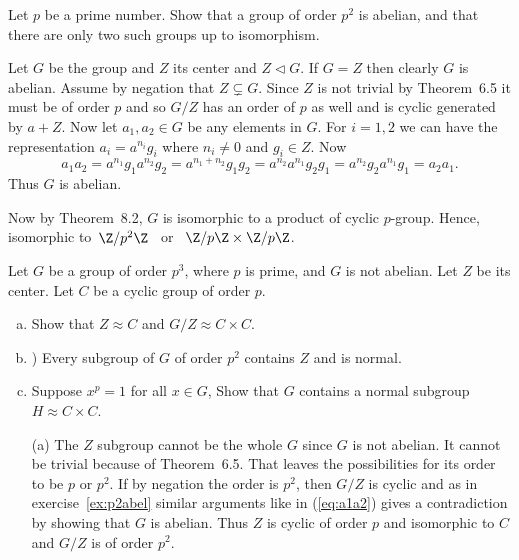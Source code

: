 \documentclass[12pt]{book}
\newcommand{\Zm}[1]{\Z/#1\Z} %
\def\subnormal{\vartriangleleft}
\newcounter{myenumi}
\newenvironment{myenumerate}
{\begin{enumerate}
 \setcounter{enumi}{\themyenumi}
}
{\setcounter{myenumi}{\theenumi}
 \end{enumerate}}
\begin{document}
\begin{myenumerate}

\begin{excopy}
Let $p$ be a prime number. Show that a group of order \(p^2\)
is abelian, and that there are only two such groups up to isomorphism.
\end{excopy}  \label{ex:p2abel}

Let $G$ be the group and $Z$ its center and \(Z\subnormal G\).
If \(G=Z\) then clearly $G$ is abelian.
Assume by negation that \(Z\subsetneq G\).
Since $Z$ is not trivial by Theorem~6.5 it must be of order $p$
and so \(G/Z\) has an order of $p$ as well and is cyclic generated by \(a+Z\).
Now let  \(a_1,a_2 \in G\) be any elements in $G$. For \(i=1,2\) we can
have the representation \(a_i=a^{n_i}g_i\) where \(n_i\neq 0\) and \(g_i\in Z\).
Now
\begin{equation} \label{eq:a1a2}
a_1a_2 = a^{n_1}g_1 a^{n_2}g_2 =
  a^{n_1+n_2}g_1g_2 =
  a^{n_2}a^{n_1}g_2g_1 =
  a^{n_2}g_2a^{n_1}g_1 = a_2a_1.
\end{equation}
Thus $G$ is abelian.

Now by Theorem~8.2, $G$ is isomorphic to a product of cyclic $p$-group.
Hence, isomorphic to\, \(\Zm{p^2}\) \, or \, \(\Zm{p}\times\Zm{p}\).


\begin{excopy}
Let $G$ be a group of order \(p^3\), where $p$ is prime, and $G$ is not abelian.
Let $Z$ be its center. Let $C$ be a cyclic group of order $p$.
\begin{enumerate}[(a)]
\item Show that \(Z \approx C\) and \(G/Z \approx C \times C\).
\item) Every subgroup of $G$ of order \(p^2\) contains $Z$ and is normal.
\item Suppose \(x^p = 1\) for all \(x \in G\),
 Show that $G$ contains a normal subgroup \hbox{\(H \approx C \times C\)}.
\end{enumerate}
\end{excopy}

\begin{itemize}
 \item[(a)]
     The $Z$ subgroup cannot be the whole $G$ since $G$ is not abelian.
     It cannot be trivial because of Theorem~6.5. That leaves the possibilities
     for its order to be $p$ or \(p^2\). If by negation the order is \(p^2\),
     then \(G/Z\) is cyclic and as in exercise~\ref{ex:p2abel}
     similar arguments like in (\ref{eq:a1a2}) gives a contradiction
     by showing that $G$ is abelian. Thus $Z$ is cyclic of order $p$
     and isomorphic to $C$ and \(G/Z\) is of order \(p^2\).


\end{itemize}
\end{myenumerate}
\end{document}
